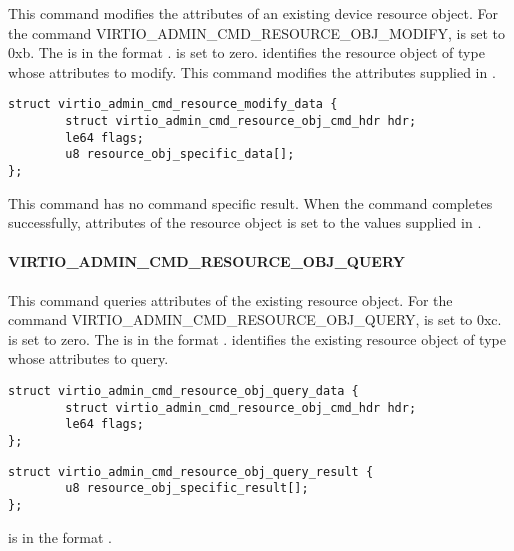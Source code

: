 This command modifies the attributes of an existing device resource object.
For the command VIRTIO_ADMIN_CMD_RESOURCE_OBJ_MODIFY,  is set to 0xb.
The  is in the format
.
 is set to zero.
 identifies the resource object of type  whose attributes
to modify.
This command modifies the attributes supplied in .

\begin{lstlisting}
struct virtio_admin_cmd_resource_modify_data {
        struct virtio_admin_cmd_resource_obj_cmd_hdr hdr;
        le64 flags;
        u8 resource_obj_specific_data[];
};
\end{lstlisting}

This command has no command specific result.
When the command completes successfully, attributes of the resource object is
set to the values supplied in .

\paragraph{VIRTIO_ADMIN_CMD_RESOURCE_OBJ_QUERY}
\label{par:Basic Facilities of a Virtio Device / Device groups / Group administration commands / Device resource objects / VIRTIO_ADMIN_CMD_RESOURCE_OBJ_QUERY}

This command queries attributes of the existing resource object.
For the command VIRTIO_ADMIN_CMD_RESOURCE_OBJ_QUERY,  is set to 0xc.
 is set to zero.
The  is in the format
.
 identifies the existing resource object of type  whose
attributes to query.

\begin{lstlisting}
struct virtio_admin_cmd_resource_obj_query_data {
        struct virtio_admin_cmd_resource_obj_cmd_hdr hdr;
        le64 flags;
};
\end{lstlisting}

\begin{lstlisting}
struct virtio_admin_cmd_resource_obj_query_result {
        u8 resource_obj_specific_result[];
};
\end{lstlisting}

 is in the format
.

